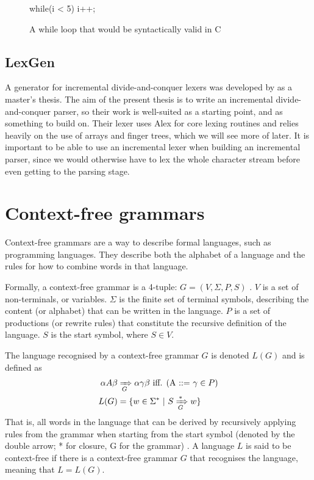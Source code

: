 \documentclass[a4paper,12pt,notitlepage]{report}
\renewcommand\cite{\citep}
\begin{document}
\begin{figure}[H]
\begin{code}
while(i < 5) {
    i++;
}
\end{code}
\caption{\small A while loop that would be syntactically valid in C}
\label{lexsample}
\end{figure}

\subsection{LexGen}
A generator for incremental divide-and-conquer lexers was developed by
\citet{divconqlex} as a master's thesis. The aim of the present thesis is to
write an incremental divide-and-conquer parser, so their work is well-suited as
a starting point, and as something to build on. Their lexer uses Alex
\cite{alex} for core lexing routines and relies heavily on the use of arrays and
finger trees, which we will see more of later. It is important to be able to use
an incremental lexer when building an incremental parser, since we would
otherwise have to lex the whole character stream before even getting to the
parsing stage.

\section{Context-free grammars}
Context-free grammars are a way to describe formal languages, such as
programming languages. They describe both the alphabet of a language and the
rules for how to combine words in that language.

Formally, a context-free grammar is a 4-tuple: $G = (V, \Sigma, P, S)$
\cite[p.171]{automatabook}. $V$ is a set of non-terminals, or variables. $\Sigma$ is
the finite set of terminal symbols, describing the content (or alphabet) that
can be written in the language. $P$ is a set of productions (or rewrite rules)
that constitute the recursive definition of the language. $S$ is the start
symbol, where $S \in V$. 

The language recognised by a context-free grammar $G$ is denoted $L(G)$ and is
defined as 
\begin{align*}
\alpha A \beta & \xRightarrow[G]\ \alpha \gamma \beta \text{ iff. (A ::= }\gamma \in P) \\
L(G) &= \{w \in \Sigma^* \ |\  S \xRightarrow[G]{*} w\}
\end{align*}
That is, all words in the language that can be derived by recursively applying
rules from the grammar when starting from the start symbol (denoted by the
double arrow; * for closure, G for the grammar) \cite[p.  177]{automatabook}. A
language $L$ is said to be context-free if there is a context-free grammar $G$
that recognises the language, meaning that $L = L(G)$.
\end{document}
